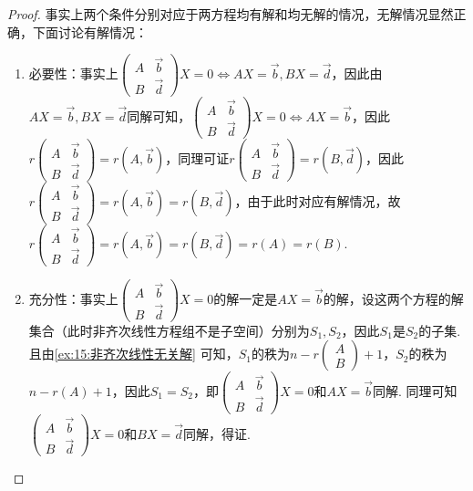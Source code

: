\begin{proof}
    事实上两个条件分别对应于两方程均有解和均无解的情况，无解情况显然正确，下面讨论有解情况：
    \begin{enumerate}
        \item 必要性：事实上$\begin{pmatrix}
                      A & \vec{b} \\ B & \vec{d}
                  \end{pmatrix}X=0\iff AX=\vec{b},BX=\vec{d}$，因此由$AX=\vec{b},BX=\vec{d}$同解可知，$\begin{pmatrix}
                      A & \vec{b} \\ B & \vec{d}
                  \end{pmatrix}X=0\iff AX=\vec{b}$，因此$r\begin{pmatrix}
                      A & \vec{b} \\ B & \vec{d}
                  \end{pmatrix}=r(A,\vec{b})$，同理可证$r\begin{pmatrix}
                      A & \vec{b} \\ B & \vec{d}
                  \end{pmatrix}=r(B,\vec{d})$，因此$r\begin{pmatrix}
                      A & \vec{b} \\ B & \vec{d}
                  \end{pmatrix}=r(A,\vec{b})=r(B,\vec{d})$，由于此时对应有解情况，故$r\begin{pmatrix}
                      A & \vec{b} \\ B & \vec{d}
                  \end{pmatrix}=r(A,\vec{b})=r(B,\vec{d})=r(A)=r(B)$.

        \item 充分性：事实上$\begin{pmatrix}
                      A & \vec{b} \\ B & \vec{d}
                  \end{pmatrix}X=0$的解一定是$AX=\vec{b}$的解，设这两个方程的解集合（此时非齐次线性方程组不是子空间）分别为$S_1,S_2$，因此$S_1$是$S_2$的子集. 且由\autoref{ex:15:非齐次线性无关解} 可知，$S_1$的秩为$n-r\begin{pmatrix}
                      A \\ B
                  \end{pmatrix}+1$，$S_2$的秩为$n-r(A)+1$，因此$S_1=S_2$，即$\begin{pmatrix}
                      A & \vec{b} \\ B & \vec{d}
                  \end{pmatrix}X=0$和$AX=\vec{b}$同解. 同理可知$\begin{pmatrix}
                      A & \vec{b} \\ B & \vec{d}
                  \end{pmatrix}X=0$和$BX=\vec{d}$同解，得证.
    \end{enumerate}
\end{proof}

